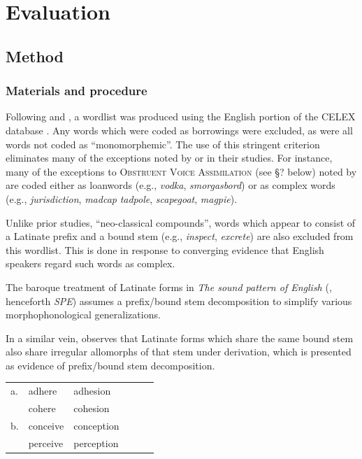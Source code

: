 \section{Evaluation}
\label{4evaluation}

\subsection{Method}

\subsubsection{Materials and procedure}

Following \citet[ chap.~8]{Duanmu2009} and \citet[ chap.~3]{Hammond1999a}, 
a wordlist was produced using the English portion of the CELEX database \citep{CELEX}. Any words which were coded as borrowings were excluded, as were all words not coded as ``monomorphemic''. The use of this stringent criterion eliminates many of the exceptions noted by \citeauthor{Duanmu2009} or \citeauthor{Hammond1999a} in their studies. For instance, many of the exceptions to \textsc{Obstruent Voice Assimilation} (see \S? below) noted by \citet[74]{Hammond1999a} are coded either as loanwords (e.g., \emph{vodka}, \emph{smorgasbord}) or as complex words (e.g., \emph{jurisdiction}, \emph{madcap} \emph{tadpole}, \emph{scapegoat}, \emph{magpie}). 

Unlike prior studies, ``neo-classical compounds'', words which appear to consist of a Latinate prefix and a bound stem (e.g., \emph{inspect}, \emph{excrete}) are also excluded from this wordlist. This is done in response to converging evidence that English speakers regard such words as complex. 

The baroque treatment of Latinate forms in \emph{The sound pattern of English} (\citealp{SPE}, henceforth \emph{SPE}) assumes a prefix/bound stem decomposition to simplify various morphophonological generalizations. 

In a similar vein, \citet[11f.]{Aronoff1976} observes that Latinate forms which share the same bound stem also share irregular allomorphs of that stem under derivation, which is presented as evidence of prefix/bound stem decomposition.

\begin{example}
\begin{tabular}{l l l l l l}
a. & {adhere}   & {adhesion}   \\
   & {cohere}   & {cohesion}   \\
b. & {conceive} & {conception} \\
   & {perceive} & {perception} \\
\end{tabular}
\end{example}

